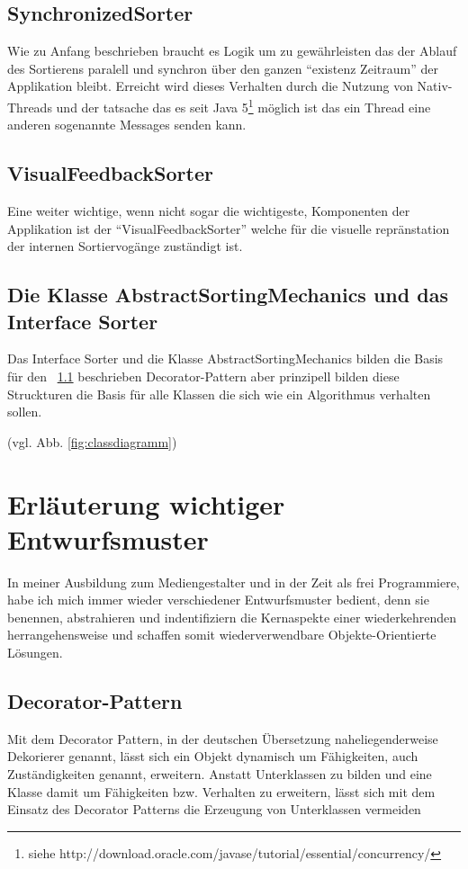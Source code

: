 \subsection{SynchronizedSorter}
Wie zu Anfang beschrieben braucht es Logik um zu gewährleisten das der Ablauf des Sortierens paralell und synchron über den ganzen
"`existenz Zeitraum"' der Applikation bleibt. Erreicht wird dieses Verhalten durch die Nutzung von Nativ-Threads und der tatsache 
das es seit Java 5\footnote{siehe http://download.oracle.com/javase/tutorial/essential/concurrency/} möglich ist das ein Thread eine anderen sogenannte Messages
senden kann.

\subsection{VisualFeedbackSorter}
Eine weiter wichtige, wenn nicht sogar die wichtigeste, Komponenten der Applikation ist der "`VisualFeedbackSorter"' welche für die visuelle repränstation 
der internen Sortiervogänge zuständigt ist.
\newpage

\subsection{Die Klasse AbstractSortingMechanics und das Interface Sorter}
Das Interface Sorter und die Klasse AbstractSortingMechanics bilden die Basis für den ~\ref{sec:decoratorpattern}
beschrieben Decorator-Pattern aber prinzipell bilden diese Struckturen die Basis für alle Klassen die sich wie ein Algorithmus verhalten sollen.

\noindent(vgl. Abb. \ref{fig:classdiagramm})

\section{Erläuterung wichtiger Entwurfsmuster}
In meiner Ausbildung zum Mediengestalter und in der Zeit als frei Programmiere, habe ich mich immer wieder verschiedener Entwurfsmuster bedient,
denn sie benennen, abstrahieren und indentifiziern die Kernaspekte einer wiederkehrenden herrangehensweise und schaffen somit wiederverwendbare
Objekte-Orientierte Lösungen.\parencite[S.3]{designpatterns}   

\subsection{Decorator-Pattern}
\label{sec:decoratorpattern}
\begin{munquote}
Mit dem Decorator Pattern, in der deutschen Übersetzung naheliegenderweise Dekorierer genannt, 
lässt sich ein Objekt dynamisch um Fähigkeiten, auch Zuständigkeiten genannt, erweitern. 
Anstatt Unterklassen zu bilden und eine Klasse damit um Fähigkeiten bzw. Verhalten zu erweitern, lässt sich mit dem Einsatz des Decorator Patterns 
die Erzeugung von Unterklassen vermeiden
\end{munquote}
\parencite[vgl. S.175-184][]{designpatterns} 
